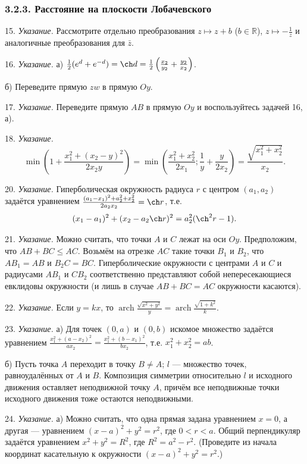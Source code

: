 	\subsubsection{3.2.3. Расстояние на плоскости Лобачевского}
 
		15. \textit{Указание.} Рассмотрите отдельно преобразования $z \mapsto z + b$ ($b \in \mathbb{R}$), $z \mapsto -\frac{1}{z}$ и аналогичные преобразования для $\bar{z}$.
 
		16. \textit{Указание.} а) $\frac{1}{2}(e^d + e^{-d}) = \ch d = \frac{1}{2}\left(\frac{x_2}{y_2} + \frac{y_2}{x_2}\right)$.
 
		б) Переведите прямую $zw$ в прямую $Oy$.
 
		17. \textit{Указание.} Переведите прямую $AB$ в прямую $Oy$ и воспользуйтесь задачей 16, а).
 
		18. \textit{Указание.}
		\[
			\min\left(1 + \frac{x_1^2 + (x_2 - y)^2}{2x_2 y}\right) = \min\left(\frac{x_1^2 + x_2^2}{2x_1} ; \frac{1}{y} + \frac{y}{2x_2}\right) = \frac{\sqrt{x_1^2 + x_2^2}}{x_2}.
		\]
 
		20. \textit{Указание.} Гиперболическая окружность радиуса $r$ с центром $(a_1, a_2)$ задаётся уравнением $\frac{(a_1 - x_1)^2 + a_2^2 + x_2^2}{2a_2 x_2} = \ch r$, т.е.
		\[
			(x_1 - a_1)^2 + (x_2 - a_2 \ch r)^2 = a_2^2(\ch^2 r - 1).
		\]
 
		21. \textit{Указание.} Можно считать, что точки $A$ и $C$ лежат на оси $Oy$. Предположим, что $AB + BC \leq AC$. Возьмём на отрезке $AC$ такие точки $B_1$ и $B_2$, что $AB_1 = AB$ и $B_2C = BC$. Гиперболические окружности с центрами $A$ и $C$ и радиусами $AB_1$ и $CB_2$ соответственно представляют собой непересекающиеся евклидовы окружности (и лишь в случае $AB + BC = AC$ окружности касаются).
 
		22. \textit{Указание.} Если $y = kx$, то $\operatorname{arch} \frac{\sqrt{x^2 + y^2}}{y} = \operatorname{arch} \frac{\sqrt{1 + k^2}}{k}$.
 
		23. \textit{Указание.} а) Для точек $(0, a)$ и $(0, b)$ искомое множество задаётся уравнением $\frac{x_1^2 + (a - x_2)^2}{ax_2} = \frac{x_1^2 + (b - x_1)^2}{bx_2}$, т.е. $x_1^2 + x_2^2 = ab$.
 
		б) Пусть точка $A$ переходит в точку $B \neq A$; $l$ --- множество точек, равноудалённых от $A$ и $B$. Композиция симметрии относительно $l$ и исходного движения оставляет неподвижной точку $A$, причём все неподвижные точки исходного движения тоже остаются неподвижными.
 
		24. \textit{Указание.} а) Можно считать, что одна прямая задана уравнением $x = 0$, а другая --- уравнением $(x - a)^2 + y^2 = r^2$, где $0 < r < a$. Общий перпендикуляр задаётся уравнением $x^2 + y^2 = R^2$, где $R^2 = a^2 - r^2$.
		(Проведите из начала координат касательную к окружности $(x-a)^2 + y^2 = r^2$.)
 
